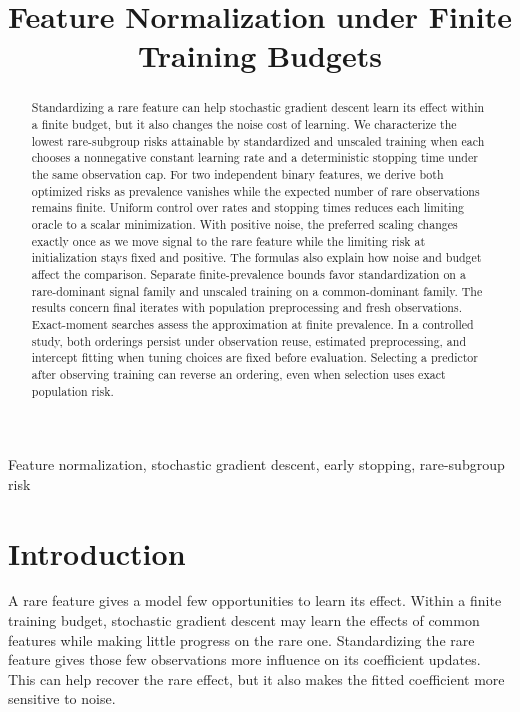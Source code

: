 \documentclass{alt2027}
\title{Feature Normalization under Finite Training Budgets}
\begin{document}
\maketitle

\begin{abstract}
  Standardizing a rare feature can help stochastic gradient descent learn its
  effect within a finite budget, but it also changes the noise cost of learning.
  We characterize the lowest rare-subgroup risks attainable by standardized and
  unscaled training when each chooses a nonnegative constant learning rate and a
  deterministic stopping time under the same observation cap. For two
  independent binary features, we derive both optimized risks as prevalence
  vanishes while the expected number of rare observations remains finite.
  Uniform control over rates and stopping times reduces each limiting oracle to
  a scalar minimization. With positive noise, the preferred scaling changes
  exactly once as we move signal to the rare feature while the limiting risk at
  initialization stays fixed and positive. The formulas also explain how noise
  and budget affect the comparison. Separate finite-prevalence bounds favor
  standardization on a rare-dominant signal family and unscaled training on a
  common-dominant family. The results concern final iterates with population
  preprocessing and fresh observations. Exact-moment searches assess the
  approximation at finite prevalence. In a controlled study, both orderings
  persist under observation reuse, estimated preprocessing, and intercept
  fitting when tuning choices are fixed before evaluation. Selecting a predictor
  after observing training can reverse an ordering, even when selection uses
  exact population risk.
\end{abstract}

\begin{keywords}
  Feature normalization, stochastic gradient descent, early stopping,
  rare-subgroup risk
\end{keywords}

\section{Introduction}

A rare feature gives a model few opportunities to learn its effect. Within a
finite training budget, stochastic gradient descent may learn the effects of
common features while making little progress on the rare one. Standardizing the
rare feature gives those few observations more influence on its coefficient
updates. This can help recover the rare effect, but it also makes the fitted
coefficient more sensitive to noise.
\end{document}
